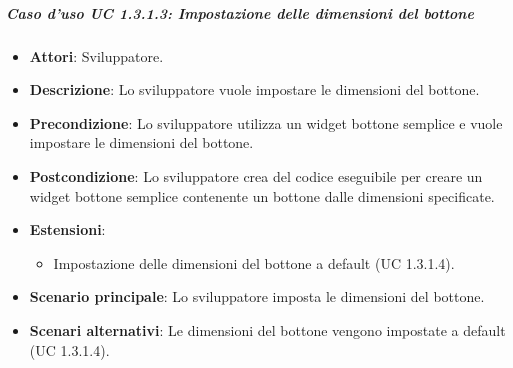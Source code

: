 \subparagraph{Caso d'uso UC 1.3.1.3: Impostazione delle dimensioni del bottone}

\FloatBarrier
\begin{itemize}
\item\textbf{Attori}: Sviluppatore.
\item\textbf{Descrizione}: Lo sviluppatore vuole impostare le dimensioni del bottone.
\item\textbf{Precondizione}: Lo sviluppatore utilizza un widget bottone semplice e vuole impostare le dimensioni del bottone.
\item\textbf{Postcondizione}: Lo sviluppatore crea del codice eseguibile per creare un widget bottone semplice contenente un bottone dalle dimensioni specificate.
\item \textbf{Estensioni}: 
\begin{itemize}
\item Impostazione delle dimensioni del bottone a default (UC 1.3.1.4).
\end{itemize}
\item \textbf{Scenario principale}: Lo sviluppatore imposta le dimensioni del bottone.
\item \textbf{Scenari alternativi}: Le dimensioni del bottone vengono impostate a default (UC 1.3.1.4).
\end{itemize}